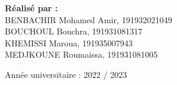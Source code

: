 \documentclass[12pt]{report}
\begin{document}
\begin{titlepage}
\begin{center}
            \large
            \textbf{Réalisé par :}\\
            BENBACHIR Mohamed Amir, 191932021049\\
            BOUCHOUL Bouchra, 191931081317\\
            KHEMISSI Maroua, 191935007943\\
            MEDJKOUNE Roumaissa, 191931081005
            
            \vfill
            Année universitaire : 2022 / 2023
        \end{center}
    \end{titlepage}
    \normalsize
    \tableofcontents
    
    \newpage
    \onehalfspacing
    
    
   
    \newpage
    \onehalfspacing
    
    
    \newpage
    \onehalfspacing
    
    
    \newpage
    \onehalfspacing
    
    
    \newpage
    \onehalfspacing
    
    
    
    \newpage
    \onehalfspacing
    
    
    \newpage
    \onehalfspacing
    
    
    \newpage
    \onehalfspacing
    
    
    \newpage
    \onehalfspacing
    
    
    \newpage
    \onehalfspacing
    
    
    \newpage
    \onehalfspacing
    
    
    \newpage
    \onehalfspacing
    
\end{document}
